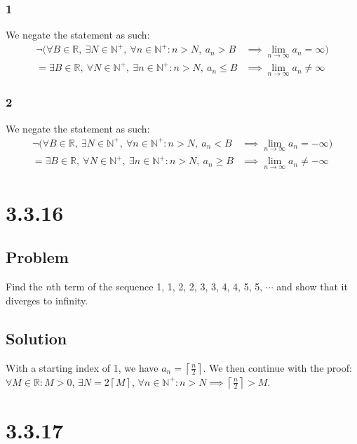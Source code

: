 \documentclass[12pt]{article}
\newcommand{\ceil} [1]{\left\lceil  #1 \right\rceil }
\newcommand{\R}    [0]{\mathbb{R}                   }
\newcommand{\N}    [0]{\mathbb{N}                   }
\begin{document}
\subsubsection*{1}
We negate the statement as such:
\begin{align*}
    \neg (\forall B \in \R,\ \exists N \in \N^+,\ \forall n \in \N^+ : n > N,\ a_n > B &\implies \lim_{n\to\infty} a_n = \infty) \\
    = \exists B \in \R,\ \forall N \in \N^+,\ \exists n \in \N^+ : n > N,\ a_n \leq B &\implies \lim_{n\to\infty} a_n \neq \infty
\end{align*}

\subsubsection*{2}
We negate the statement as such:
\begin{align*}
    \neg (\forall B \in \R,\ \exists N \in \N^+,\ \forall n \in \N^+ : n > N,\ a_n < B &\implies \lim_{n\to\infty} a_n = -\infty) \\
    = \exists B \in \R,\ \forall N \in \N^+,\ \exists n \in \N^+ : n > N,\ a_n \geq B &\implies \lim_{n\to\infty} a_n \neq -\infty
\end{align*}



\section*{3.3.16}

\subsection*{Problem}
Find the $n$th term of the sequence 1, 1, 2, 2, 3, 3, 4, 4, 5, 5, $\cdots$ and show that it diverges to infinity.

\subsection*{Solution}
With a starting index of 1, we have $a_n = \ceil{\frac{n}{2}}$. We then continue with the proof:
$\forall M \in \R : M > 0$, $\exists N = 2\ceil{M}$, $\forall n \in \N^+ : n > N \implies \ceil{\frac{n}{2}} > M$.



\section*{3.3.17}
\end{document}
